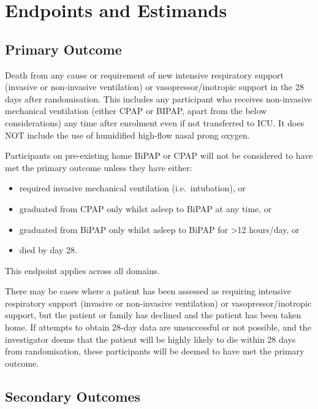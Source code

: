 \documentclass[
  11pt,
]{article}
\providecommand{\tightlist}{%
  \setlength{\itemsep}{0pt}\setlength{\parskip}{0pt}}
\begin{document}
\hypertarget{endpoints-and-estimands}{%
\section{Endpoints and Estimands}\label{endpoints-and-estimands}}

\hypertarget{primary-outcome}{%
\subsection{Primary Outcome}\label{primary-outcome}}

Death from any cause or requirement of new intensive respiratory support (invasive or non-invasive ventilation) or vasopressor/inotropic support in the 28 days after randomisation.
This includes any participant who receives non-invasive mechanical ventilation (either CPAP or BIPAP, apart from the below considerations) any time after enrolment even if not transferred to ICU.
It does NOT include the use of humidified high-flow nasal prong oxygen.

Participants on pre-existing home BiPAP or CPAP will not be considered to have met the primary outcome unless they have either:

\begin{itemize}
\tightlist
\item
  required invasive mechanical ventilation (i.e.~intubation), or
\item
  graduated from CPAP only whilst asleep to BiPAP at any time, or
\item
  graduated from BiPAP only whilst asleep to BiPAP for \textgreater12 hours/day, or
\item
  died by day 28.
\end{itemize}

This endpoint applies across all domains.

There may be cases where a patient has been assessed as requiring intensive respiratory support (invasive or non-invasive ventilation) or vasopressor/inotropic support, but the patient or family has declined and the patient has been taken home.
If attempts to obtain 28-day data are unsuccessful or not possible, and the investigator deems that the patient will be highly likely to die within 28 days from randomisation, these participants will be deemed to have met the primary outcome.

\hypertarget{secondary-outcomes}{%
\subsection{Secondary Outcomes}\label{secondary-outcomes}}
\end{document}
